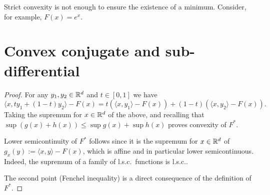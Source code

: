 \documentclass{report}
\begin{document}
	\begin{remark}
		Strict convexity is not enough to ensure the existence of a minimum. Consider, for example, $F(x) = e^x$.
	\end{remark}

\section{Convex conjugate and sub-differential}



\begin{proof}
	For any $y_1,y_2\in\mathbb{R}^d$ and $t\in[0,1]$ we have
	\begin{equation}
		\langle x, ty_1+(1-t)y_2 \rangle-F(x) = 
		t \left(\langle x, y_1\rangle-F(x)\right) + (1-t) \left(\langle x, y_2\rangle-F(x)\right).
	\end{equation}
	Taking the supremum for $x\in\mathbb{R}^d$ of the above, and recalling that $\sup(g(x)+h(x))\le \sup g(x)+\sup h(x)$ proves convexity of $F^*$. 

	Lower semicontinuity of $F^*$ follows since it is the supremum for $x\in\mathbb{R}^d$ of $g_x(y):=\langle x,y\rangle -F(x)$, which is affine and in particular lower semicontinuous. Indeed, the supremum of a family of l.s.c.~functions is l.s.c..

	The second point (Fenchel inequality) is a direct consequence of the definition of $F^*$.
\end{proof}

\end{document}
